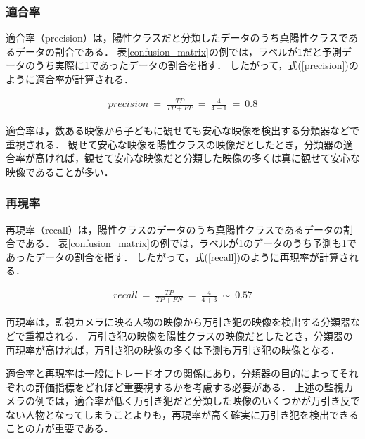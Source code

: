\documentclass[12pt,a4j,dvipdfmx]{jreport}
\begin{document}


\subsubsection{適合率}
\label{subsubsection_precision}
適合率（precision）は，陽性クラスだと分類したデータのうち真陽性クラスであるデータの割合である\cite{aurellen20}．
表\ref{confusion_matrix}の例では，ラベルが1だと予測データのうち実際に1であったデータの割合を指す．
したがって，式(\ref{precision})のように適合率が計算される．

\begin{align}
  precision ~=~ \frac{TP}{TP+FP} ~=~ \frac{4}{4+1} ~=~ 0.8
  \label{precision}
\end{align}

\newpage

適合率は，数ある映像から子どもに観せても安心な映像を検出する分類器などで重視される．
観せて安心な映像を陽性クラスの映像だとしたとき，分類器の適合率が高ければ，観せて安心な映像だと分類した映像の多くは真に観せて安心な映像であることが多い．


\subsubsection{再現率}
\label{subsubsection_recall}
再現率（recall）は，陽性クラスのデータのうち真陽性クラスであるデータの割合である\cite{aurellen20}．
表\ref{confusion_matrix}の例では，ラベルが1のデータのうち予測も1であったデータの割合を指す．
したがって，式(\ref{recall})のように再現率が計算される．

\begin{align}
  recall ~=~ \frac{TP}{TP+FN} ~=~ \frac{4}{4+3} ~\sim~ 0.57
  \label{recall}
\end{align}

再現率は，監視カメラに映る人物の映像から万引き犯の映像を検出する分類器などで重視される．
万引き犯の映像を陽性クラスの映像だとしたとき，分類器の再現率が高ければ，万引き犯の映像の多くは予測も万引き犯の映像となる．

適合率と再現率は一般にトレードオフの関係にあり，分類器の目的によってそれぞれの評価指標をどれほど重要視するかを考慮する必要がある．
上述の監視カメラの例では，適合率が低く万引き犯だと分類した映像のいくつかが万引き反でない人物となってしまうことよりも，再現率が高く確実に万引き犯を検出できることの方が重要である．
\end{document}
